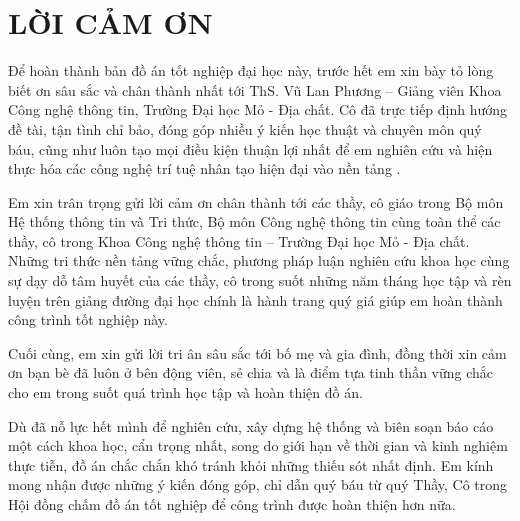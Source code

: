 \cleardoublepage
{}
\chapter*{LỜI CẢM ƠN}
\thispagestyle{adminform}

Để hoàn thành bản đồ án tốt nghiệp đại học này, trước hết em xin bày tỏ lòng biết ơn sâu sắc và chân thành nhất tới ThS. Vũ Lan Phương -- Giảng viên Khoa Công nghệ thông tin, Trường Đại học Mỏ - Địa chất. Cô đã trực tiếp định hướng đề tài, tận tình chỉ bảo, đóng góp nhiều ý kiến học thuật và chuyên môn quý báu, cũng như luôn tạo mọi điều kiện thuận lợi nhất để em nghiên cứu và hiện thực hóa các công nghệ trí tuệ nhân tạo hiện đại vào nền tảng \VS.

Em xin trân trọng gửi lời cảm ơn chân thành tới các thầy, cô giáo trong Bộ môn Hệ thống thông tin và Tri thức, Bộ môn Công nghệ thông tin cùng toàn thể các thầy, cô trong Khoa Công nghệ thông tin -- Trường Đại học Mỏ - Địa chất. Những tri thức nền tảng vững chắc, phương pháp luận nghiên cứu khoa học cùng sự dạy dỗ tâm huyết của các thầy, cô trong suốt những năm tháng học tập và rèn luyện trên giảng đường đại học chính là hành trang quý giá giúp em hoàn thành công trình tốt nghiệp này.

Cuối cùng, em xin gửi lời tri ân sâu sắc tới bố mẹ và gia đình, đồng thời xin cảm ơn bạn bè đã luôn ở bên động viên, sẻ chia và là điểm tựa tinh thần vững chắc cho em trong suốt quá trình học tập và hoàn thiện đồ án.

Dù đã nỗ lực hết mình để nghiên cứu, xây dựng hệ thống và biên soạn báo cáo một cách khoa học, cẩn trọng nhất, song do giới hạn về thời gian và kinh nghiệm thực tiễn, đồ án chắc chắn khó tránh khỏi những thiếu sót nhất định. Em kính mong nhận được những ý kiến đóng góp, chỉ dẫn quý báu từ quý Thầy, Cô trong Hội đồng chấm đồ án tốt nghiệp để công trình được hoàn thiện hơn nữa.
